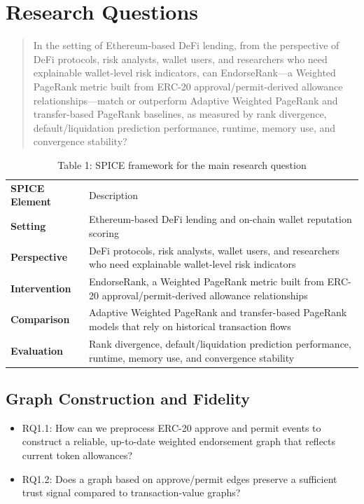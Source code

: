 \documentclass[
]{article}
\begin{document}
\section{Research Questions}\label{research-questions}

\begin{quote}
In the setting of Ethereum-based DeFi lending, from the perspective of DeFi protocols, risk analysts, wallet users, and researchers who need explainable wallet-level risk indicators, can EndorseRank---a Weighted PageRank metric built from ERC-20 approval/permit-derived allowance relationships---match or outperform Adaptive Weighted PageRank and transfer-based PageRank baselines, as measured by rank divergence, default/liquidation prediction performance, runtime, memory use, and convergence stability?
\end{quote}

\begin{longtable}[]{@{}
  >{\centering\arraybackslash}p{}
  >{\centering\arraybackslash}p{}@{}}
\caption{Table 1: SPICE framework for the main research question}\tabularnewline
\toprule\noalign{}
\endfirsthead
\endhead
\bottomrule\noalign{}
\endlastfoot
\textbf{SPICE Element} & Description \\
\textbf{Setting} & Ethereum-based DeFi lending and on-chain wallet reputation scoring \\
\textbf{Perspective} & DeFi protocols, risk analysts, wallet users, and researchers who need explainable wallet-level risk indicators \\
\textbf{Intervention} & EndorseRank, a Weighted PageRank metric built from ERC-20 approval/permit-derived allowance relationships \\
\textbf{Comparison} & Adaptive Weighted PageRank and transfer-based PageRank models that rely on historical transaction flows \\
\textbf{Evaluation} & Rank divergence, default/liquidation prediction performance, runtime, memory use, and convergence stability \\
\end{longtable}

\subsection{Graph Construction and Fidelity}\label{graph-construction-and-fidelity}

\begin{itemize}
\item
  RQ1.1: How can we preprocess ERC-20 approve and permit events to construct a reliable, up-to-date weighted endorsement graph that reflects current token allowances?
\item
  RQ1.2: Does a graph based on approve/permit edges preserve a sufficient trust signal compared to transaction-value graphs?
\end{itemize}
\end{document}
